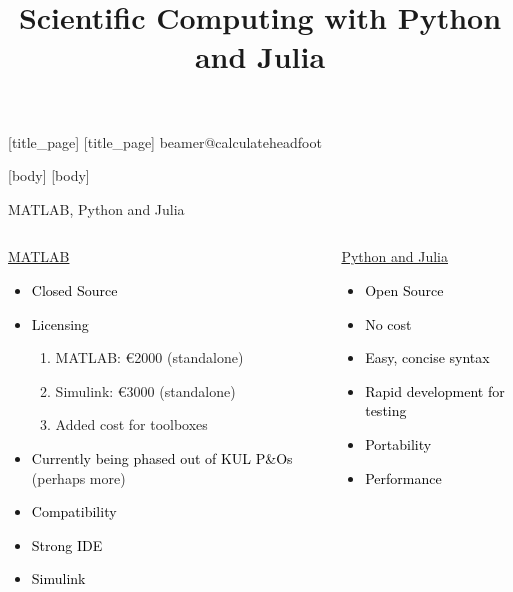 \documentclass[11pt,t]{beamer}
\title{Scientific Computing with Python and Julia}
\begin{document}
	[title_page]
	[title_page]
	\csname beamer@calculateheadfoot\endcsname %
		\begin{frame}
			\titlepage
		\end{frame}
	[body]
	[body]


\begin{frame}[t]{MATLAB, Python and Julia}
	\begin{columns}[t]
		\begin{column}{.6\textwidth}
		\begin{center}
				\underline{MATLAB}
		\end{center}
		\begin{itemize}
			\item  \textcolor{black}{Closed Source}
			\item \textcolor{black}{Licensing}
				\begin{enumerate}
			\item  MATLAB: 	\euro 2000 (standalone)		
			\item Simulink: \euro 3000 (standalone)	
			\item Added cost for toolboxes
		\end{enumerate}
		\item \textcolor{black}{Currently being phased out of KUL P\&Os} (perhaps more)
		\item  \textcolor{black}{Compatibility}
		\item \textcolor{black}{Strong IDE}
		\item \textcolor{black}{Simulink}
		\end{itemize}
		\end{column}
		\begin{column}{.6\textwidth}
					\begin{center}
				 \underline{Python and Julia}
		\end{center}
		\begin{itemize}
			\item  \textcolor{black}{Open Source}
			\item \textcolor{black}{No cost}
			\item \textcolor{black}{Easy, concise syntax}
			\item \textcolor{black}{Rapid development for testing}
			\item \textcolor{black}{Portability}
			\item \textcolor{black}{Performance}
		\end{itemize}
		\end{column}
	\end{columns}	
\end{frame}
\end{document}
